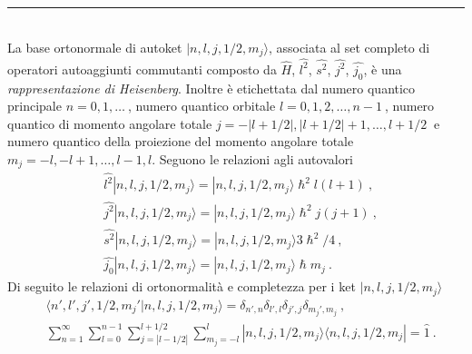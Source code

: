 \documentclass[12pt,a4paper]{report}
\numberwithin{equation}{section}
\numberwithin{section}{chapter}
\begin{document}
	\noindent\rule[0.1cm]{15.8cm}{0.1mm}\\
	La base ortonormale di autoket $|n,l,j,1/2,m_j\rangle$, associata al set completo di operatori autoaggiunti commutanti composto da $\widehat{H}$, $\widehat{l^2}$, $\widehat{s^2}$, $\widehat{j^2}$, $\widehat{j_0}$, \`e una \textit{rappresentazione di Heisenberg}. Inoltre \`e etichettata dal numero quantico principale $n=0,1,\dots~$, numero quantico orbitale $l=0,1,2,\dots,n-1~$, numero quantico di momento angolare totale $j=-|l+1/2|,|l+1/2|+1,\dots,l+1/2~$ e numero quantico della proiezione del momento angolare totale $m_j=-l,-l+1,\dots,l-1,l$. Seguono le relazioni agli autovalori
	\begin{subequations}
		\begin{align}
		&\widehat{l^2}|n,l,j,1/2,m_j\rangle = |n,l,j,1/2,m_j\rangle\hslash^2l(l+1)~,\label{impteo10:first}\\
		&\widehat{j^2}|n,l,j,1/2,m_j\rangle = |n,l,j,1/2,m_j\rangle\hslash^2j(j+1)~,\label{impteo10:second}\\
		&\widehat{s^2}|n,l,j,1/2,m_j\rangle = |n,l,j,1/2,m_j\rangle 3\hslash^2/4~,\label{impteo10:third}\\
		&\widehat{j_0}|n,l,j,1/2,m_j\rangle = |n,l,j,1/2,m_j\rangle\hslash m_j~.\label{impteo10:fourth}
		\end{align}
	\end{subequations}
	Di seguito le relazioni di ortonormalit\`a e completezza per i ket $|n,l,j,1/2,m_j\rangle$
	\begin{subequations}
		\begin{align}
		&\langle n',l',j',1/2,{m_j}'|n,l,j,1/2,m_j\rangle = \delta_{n',n}\delta_{l',l}\delta_{j',j}\delta_{{m_j}',m_j}~,\label{impteo11:first}\\
		&\sum\nolimits_{n=1}^{\infty}\sum\nolimits_{l=0}^{n-1}\sum\nolimits_{j=|l-1/2|}^{l+1/2}\sum\nolimits_{m_j=-l}^{l} |n,l,j,1/2,m_j\rangle\langle n,l,j,1/2,m_j| = \widehat{1}~.\label{impteo11:second}
		\end{align}
	\end{subequations}
	
\end{document}
